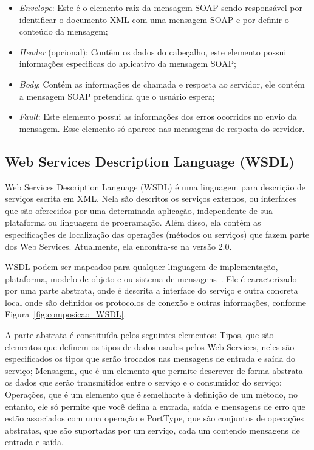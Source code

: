  \begin{itemize}
            \item \emph{Envelope}: Este é o elemento raiz da mensagem SOAP sendo responsável por identificar o documento XML com uma mensagem SOAP e por definir o conteúdo da mensagem;

            \item \emph{Header} (opcional): Contêm os dados do cabeçalho, este elemento possui informações especificas do aplicativo da mensagem SOAP;

            \item \emph{Body}: Contém as informações de chamada e resposta ao servidor, ele contém a mensagem SOAP pretendida que o usuário espera;

            \item \emph{Fault}: Este elemento possui as informações dos erros ocorridos no envio da mensagem. Esse elemento só aparece nas mensagens de resposta do servidor.

 \end{itemize}


\subsection{Web Services Description Language (WSDL)}

Web Services Description Language (WSDL) é uma linguagem para descrição de serviços escrita em XML. Nela são descritos os serviços externos, ou interfaces que são oferecidos por uma determinada aplicação, independente de sua plataforma ou linguagem de programação. Além disso, ela contém as especificações de localização das operações (métodos ou serviços) que fazem parte dos Web Services. Atualmente, ela encontra-se na versão 2.0.

WSDL podem ser mapeados para qualquer linguagem de implementação, plataforma, modelo de objeto e ou sistema de mensagens~\cite{Bertino2010}. Ele é caracterizado por uma parte abstrata, onde é descrita a interface do serviço e outra concreta local onde são definidos os protocolos de conexão e outras informações, conforme Figura~\ref{fig:composicao_WSDL}.

A parte abstrata é constituída pelos seguintes elementos: Tipos, que são elementos que definem os tipos de dados usados pelos Web Services, neles são especificados os tipos que serão trocados nas mensagens de entrada e saída do serviço; Mensagem, que é um elemento que permite descrever de forma abstrata os dados que serão transmitidos entre o serviço e o consumidor do serviço; Operações, que é um elemento que é semelhante à definição de um método, no entanto, ele só permite que você defina a entrada, saída e mensagens de erro que estão associados com uma operação e PortType, que são conjuntos de operações abstratas, que são suportadas por um serviço, cada um contendo mensagens de entrada e saída.

